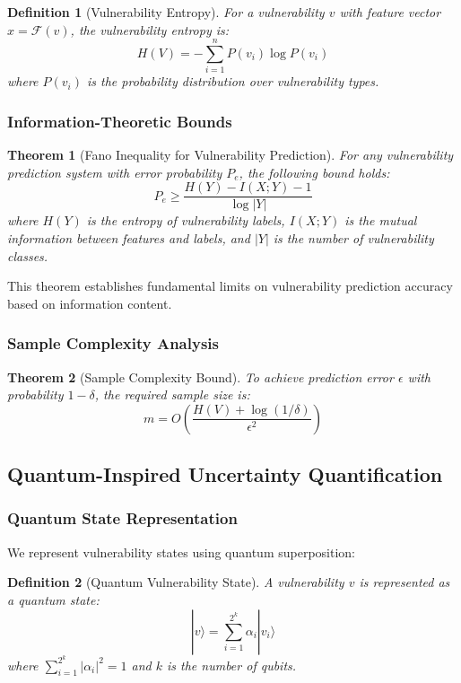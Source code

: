 \documentclass[journal]{IEEEtran}
\newtheorem{theorem}{Theorem}
\newtheorem{definition}{Definition}
\begin{document}
\begin{definition}[Vulnerability Entropy]
For a vulnerability $v$ with feature vector $x = \mathcal{F}(v)$, the vulnerability entropy is:
$$H(V) = -\sum_{i=1}^{n} P(v_i) \log P(v_i)$$
where $P(v_i)$ is the probability distribution over vulnerability types.
\end{definition}

\subsubsection{Information-Theoretic Bounds}

\begin{theorem}[Fano Inequality for Vulnerability Prediction]
For any vulnerability prediction system with error probability $P_e$, the following bound holds:
$$P_e \geq \frac{H(Y) - I(X;Y) - 1}{\log|Y|}$$
where $H(Y)$ is the entropy of vulnerability labels, $I(X;Y)$ is the mutual information between features and labels, and $|Y|$ is the number of vulnerability classes.
\end{theorem}

This theorem establishes fundamental limits on vulnerability prediction accuracy based on information content.

\subsubsection{Sample Complexity Analysis}

\begin{theorem}[Sample Complexity Bound]
To achieve prediction error $\epsilon$ with probability $1-\delta$, the required sample size is:
$$m = O\left(\frac{H(V) + \log(1/\delta)}{\epsilon^2}\right)$$
\end{theorem}

\subsection{Quantum-Inspired Uncertainty Quantification}

\subsubsection{Quantum State Representation}

We represent vulnerability states using quantum superposition:

\begin{definition}[Quantum Vulnerability State]
A vulnerability $v$ is represented as a quantum state:
$$|v\rangle = \sum_{i=1}^{2^k} \alpha_i |v_i\rangle$$
where $\sum_{i=1}^{2^k} |\alpha_i|^2 = 1$ and $k$ is the number of qubits.
\end{definition}
\end{document}
